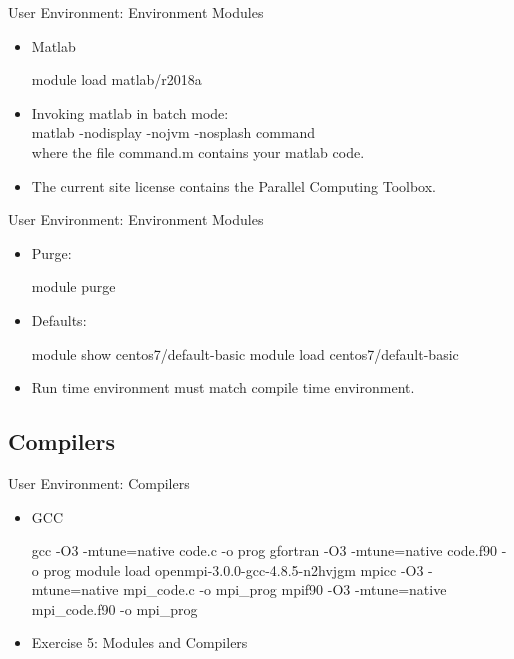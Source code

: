 \begin{frame}[fragile]{User Environment: Environment Modules}
\begin{itemize}
\item{Matlab}
\begin{semiverbatim}
\scriptsize
module load matlab/r2018a
\end{semiverbatim}
\medskip\pause
\item{Invoking matlab in batch mode:\hfill\\
  \qquad \alert{matlab -nodisplay -nojvm -nosplash command}\hfill\\
  where the file \alert{command.m} contains your matlab code.}
  \pause
  \item{The current site license contains the Parallel Computing Toolbox.}
\end{itemize}
\end{frame}

\begin{frame}[fragile]{User Environment: Environment Modules}
\begin{itemize}
\item{Purge:}
\begin{semiverbatim}
\scriptsize
module purge
\end{semiverbatim}
\smallskip
\item{Defaults:}
\begin{semiverbatim}
\scriptsize
module show centos7/default-basic
module load centos7/default-basic
\end{semiverbatim}
\medskip
\item{Run time environment must match compile time environment.}
\end{itemize}
\end{frame}

\subsection{Compilers}
\begin{frame}[fragile]{User Environment: Compilers}
  \begin{itemize}
    \item{GCC}
\begin{semiverbatim}
\scriptsize
gcc -O3 -mtune=native code.c -o prog
gfortran -O3 -mtune=native code.f90 -o prog
\medskip
module load openmpi-3.0.0-gcc-4.8.5-n2hvjgm
mpicc -O3 -mtune=native mpi_code.c -o mpi_prog
mpif90 -O3 -mtune=native mpi_code.f90 -o mpi_prog
\end{semiverbatim}
\pause
\item{Exercise 5: Modules and Compilers}
\end{itemize}
\end{frame}


